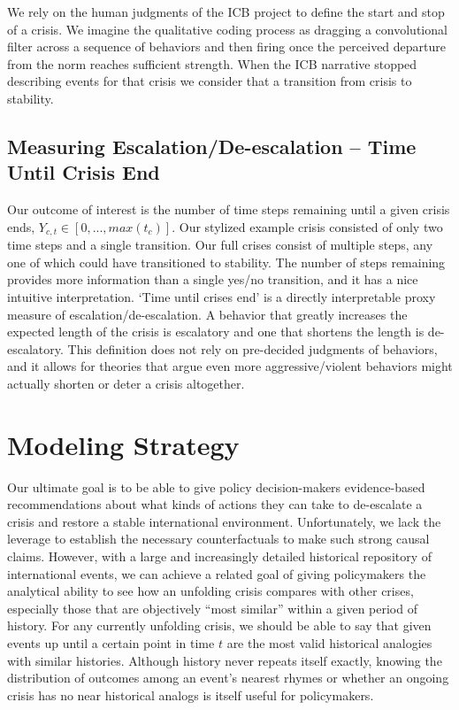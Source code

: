 \documentclass[
  letterpaper,
  DIV=11,
  numbers=noendperiod]{scrartcl}
\begin{document}
We rely on the human judgments of the ICB project to define the start
and stop of a crisis. We imagine the qualitative coding process as
dragging a convolutional filter across a sequence of behaviors and then
firing once the perceived departure from the norm reaches sufficient
strength. When the ICB narrative stopped describing events for that
crisis we consider that a transition from crisis to stability.

\subsection{Measuring Escalation/De-escalation -- Time Until Crisis
End}\label{measuring-escalationde-escalation-time-until-crisis-end}

Our outcome of interest is the number of time steps remaining until a
given crisis ends, \(Y_{c,t}\in [0,...,max(t_c)]\). Our stylized example
crisis consisted of only two time steps and a single transition. Our
full crises consist of multiple steps, any one of which could have
transitioned to stability. The number of steps remaining provides more
information than a single yes/no transition, and it has a nice intuitive
interpretation. `Time until crises end' is a directly interpretable
proxy measure of escalation/de-escalation. A behavior that greatly
increases the expected length of the crisis is escalatory and one that
shortens the length is de-escalatory. This definition does not rely on
pre-decided judgments of behaviors, and it allows for theories that
argue even more aggressive/violent behaviors might actually shorten or
deter a crisis altogether.

\section{Modeling Strategy}\label{modeling-strategy}

Our ultimate goal is to be able to give policy decision-makers
evidence-based recommendations about what kinds of actions they can take
to de-escalate a crisis and restore a stable international environment.
Unfortunately, we lack the leverage to establish the necessary
counterfactuals to make such strong causal claims. However, with a large
and increasingly detailed historical repository of international events,
we can achieve a related goal of giving policymakers the analytical
ability to see how an unfolding crisis compares with other crises,
especially those that are objectively ``most similar'' within a given
period of history. For any currently unfolding crisis, we should be able
to say that given events up until a certain point in time \(t\) are the
most valid historical analogies with similar histories. Although history
never repeats itself exactly, knowing the distribution of outcomes among
an event's nearest rhymes or whether an ongoing crisis has no near
historical analogs is itself useful for policymakers.
\end{document}
